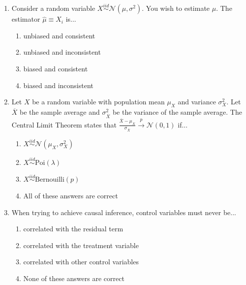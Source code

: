 \documentclass{article}
\begin{document}
\begin{enumerate}
\item Consider a random variable $X\stackrel{iid}{\sim}\mathcal{N}(\mu, \sigma^2)$. You wish to estimate $\mu$. The estimator $\hat{\mu}\equiv X_i$ is...

\begin{enumerate}[label=\alph*)]
\item unbiased and consistent
\item unbiased and inconsistent
\item biased and consistent
\item biased and inconsistent
\end{enumerate}\vspace{.25cm}


\item Let $X$ be a random variable with population mean $\mu_X$ and variance $\sigma^2_{X}$. Let $\overline{X}$ be the sample average and $\sigma^2_{\overline{X}}$ be the variance of the sample average. The Central Limit Theorem states that $\frac{\overline{X}-\mu_X}{\sigma_{\overline{X}}}\overset{p}{\to}\mathcal{N}(0,1)$ if...

\begin{enumerate}[label=\alph*)]
\item $X\stackrel{iid}{\sim}\mathcal{N}(\mu_X, \sigma_X^2)$
\item $X\stackrel{iid}{\sim}\text{Poi}(\lambda)$
\item $X\stackrel{iid}{\sim}\text{Bernouilli}(p)$
\item All of these answers are correct
\end{enumerate}\vspace{.25cm}


\item When trying to achieve causal inference, control variables must never be...

\begin{enumerate}[label=\alph*)]
\item correlated with the residual term
\item correlated with the treatment variable
\item correlated with other control variables
\item None of these answers are correct
\end{enumerate}\vspace{.25cm}



\end{enumerate}
\end{document}
